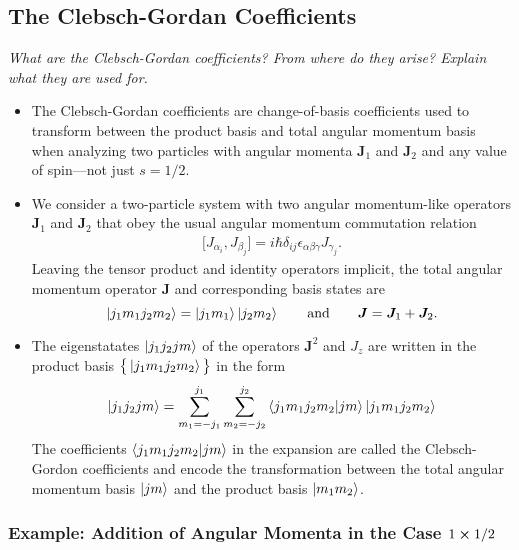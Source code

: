 \documentclass[11pt, a4paper]{article}
\renewcommand{\vec}[1]{\bm{#1}}  %
\newcommand{\J}{\vec{J}}  %
\begin{document}
\subsection{The Clebsch-Gordan Coefficients}
\textit{What are the Clebsch-Gordan coefficients? From where do they arise? Explain what they are used for.}

\begin{itemize}
    \item The Clebsch-Gordan coefficients are change-of-basis coefficients used to transform between the product basis and total angular momentum basis when analyzing two particles with angular momenta $ \J_{1} $ and $ \J_{2} $ and any value of spin---not just $ s = 1/2 $.

    \item We consider a two-particle system with two angular momentum-like operators $ \J_{1} $ and $ \J_{2} $ that obey the usual angular momentum commutation relation
    \begin{align*}
        \big[ J_{\alpha_{i}}, J_{\beta_{j}} \big] = i \hbar \delta_{ij}\epsilon_{\alpha\beta\gamma}J_{\gamma_{j}}.
    \end{align*}
    Leaving the tensor product and identity operators implicit, the total angular momentum operator $ \J $ and corresponding basis states are
    \begin{equation*}
        \ket{j_{1}m_{1}j_{2}m_{2}} = \ket{j_{1}m_{1}}\ket{j_{2}m_{2}} \qquad \text{and} \qquad \J = \J_{1} + \J_{2}.
    \end{equation*}
 
    \item The eigenstatates $ \ket{j_{1}j_{2}jm} $ of the operators $ \J^{2} $ and $ J_{z} $ are written in the product basis $ \big\{ \ket{j_{1}m_{1}j_{2}m_{2}} \big\} $ in the form
    \begin{equation*}
        \ket{j_{1}j_{2}jm} = \sum_{m_{1} = - j_{1}}^{j_{1}}\sum_{m_{2} = - j_{2}}^{j_{2}} \braket{j_{1}m_{1}j_{2}m_{2}}{jm} \ket{j_{1}m_{1}j_{2}m_{2}}
    \end{equation*}
    The coefficients $ \braket{j_{1}m_{1}j_{2}m_{2}}{jm} $ in the expansion are called the Clebsch-Gordon coefficients and encode the transformation between the total angular momentum basis $ \ket{jm} $ and the product basis $ \ket{m_{1}m_{2}} $. 

\end{itemize}

\subsubsection{Example: Addition of Angular Momenta in the Case $ 1 \cross 1/2 $}
\end{document}
